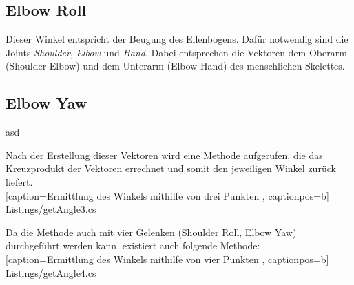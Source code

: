 \subsection{Elbow Roll}
Dieser Winkel entspricht der Beugung des Ellenbogens. Dafür notwendig sind die Joints \textit{Shoulder}, \textit{Elbow} und \textit{Hand}. Dabei entsprechen die Vektoren dem Oberarm (Shoulder-Elbow) und dem Unterarm (Elbow-Hand) des menschlichen Skelettes.

\subsection{Elbow Yaw}
asd



Nach der Erstellung dieser Vektoren wird eine Methode aufgerufen, die das Kreuzprodukt der Vektoren errechnet und somit den jeweiligen Winkel zurück liefert. \\


    [caption={Ermittlung des Winkels mithilfe von drei Punkten}
       \label{lst:3joints},
       captionpos=b]
 {Listings/getAngle3.cs}



\noindent Da die Methode auch mit vier Gelenken (Shoulder Roll, Elbow Yaw) durchgeführt werden kann, existiert auch folgende Methode: \\


    [caption={Ermittlung des Winkels mithilfe von vier Punkten}
       \label{lst:4joints},
       captionpos=b]
 {Listings/getAngle4.cs}


